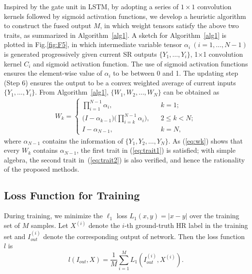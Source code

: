 \documentclass[journal]{IEEEtran}
\begin{document}
Inspired by the gate unit in LSTM, by adopting a series of $1\times1$ convolution kernels followed by sigmoid activation functions, we develop a heuristic algorithm to construct the fused output $M$, in which weight tensors satisfy the above two traits, as summarized in Algorithm~\ref{alg1}.
A sketch for Algorithm~\ref{alg1} is plotted in Fig.\ref{fig:F5}, in which intermediate variable tensor $\alpha_{i} \ (i=1,\ldots,N-1)$ is generated progressively given current SR outputs $\{Y_{1}, \dots, Y_{i}\}$, 1$\times$1 convolution kernel $C_{i}$ and sigmoid activation function. The use of sigmoid activation functions ensures the element-wise value of $\alpha_{i}$ to be between 0 and 1. The updating step (Step 6) ensures the output to be a convex weighted average of current inputs $\{Y_{1}, \dots, Y_{i}\}$.
From Algorithm~\ref{alg1}, $\{W_{1}, W_{2}, \dots,W_{N}\}$ can be obtained as
\begin{equation}
\begin{split}
W_{k}=\left\{
\begin{array}{lrc}
\displaystyle \prod_{i=1}^{N-1}\alpha_{i},   &      & {k = 1}; \\
\displaystyle \big (I-\alpha_{k-1} \big ) \big (\prod_{i=k}^{N-1}\alpha_{i} \big ),     &      & {2 \leq k < N}; \\
\displaystyle I-\alpha_{N-1},       &      & {k=N}, 
\end{array} \right.
\end{split}
\label{eq:wk}
\end{equation}
where $\alpha_{N-1}$ contains the information of $\{Y_{1}, Y_{2}, \dots, Y_{N}\}$. As (\ref{eq:wk}) shows that every $W_{k}$ contains $\alpha_{N-1}$, the first trait in (\ref{eq:trait1}) is satisfied; with simple algebra, the second trait in~(\ref{eq:trait2}) is also verified, and hence the rationality of the proposed methods.


\subsection{Loss Function for Training}

During training, we minimize the $\ell_{1}$ loss $L_{1}(x,y) = |x-y|$ over the training set of $M$ samples.
Let $X^{(i)}$ denote the $i$-th ground-truth HR label in the training set and $I_{out}^{(i)}$ denote the corresponding output of network. Then the loss function  $l$ is
\begin{equation}
l(I_{out}, X)=\frac{1}{M}\sum_{i=1}^{M}L_{1}(I_{out}^{(i)},X^{(i)}).
\end{equation}
\end{document}
